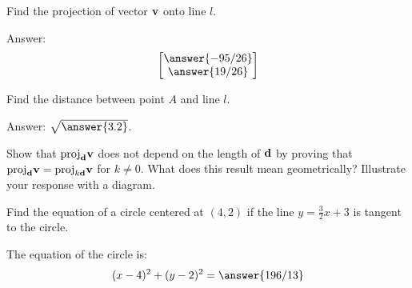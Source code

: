 \documentclass{ximera}
\renewcommand{\vec}[1]{{\bf #1}}
\begin{document}
\begin{problem}
Find the projection of vector $\vec{v}$ onto line $l$.

\begin{image}
\end{image}

Answer:
$$\begin{bmatrix}\answer{-95/26}\\\answer{19/26}\end{bmatrix}$$
\end{problem}
\begin{problem}
Find the distance between point $A$ and line $l$.

\begin{image}
\end{image}

Answer: $\sqrt{\answer{3.2}}$.
\end{problem}
\begin{problem}
Show that $\text{proj}_{\vec{d}}\vec{v}$ does not depend on the length of $\vec{d}$ by proving that $\text{proj}_{\vec{d}}\vec{v}=\text{proj}_{k\vec{d}}\vec{v}$ for $k\neq 0$.  What does this result mean geometrically?  Illustrate your response with a diagram.
\end{problem}
\begin{problem}
Find the equation of a circle centered at $(4, 2)$ if the line $y=\frac{3}{2}x+3$ is tangent to the circle.

The equation of the circle is:
$$(x-4)^2+(y-2)^2=\answer{196/13}$$
\end{problem}
\end{document}
